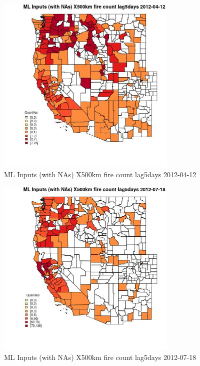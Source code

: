\begin{figure} 
\centering  
\includegraphics[width=0.77\textwidth]{Code_Outputs/Report_ML_input_PM25_Step4_part_e_de_duplicated_aves_compiled_2019-05-14wNAs_CountyX500km_fire_count_lag5daysMean2012-04-12_2012-04-12.jpg} 
\caption{\label{fig:Report_ML_input_PM25_Step4_part_e_de_duplicated_aves_compiled_2019-05-14wNAsCountyX500km_fire_count_lag5daysMean2012-04-12_2012-04-12}ML Inputs (with NAs) X500km fire count lag5days 2012-04-12} 
\end{figure} 
 

\begin{figure} 
\centering  
\includegraphics[width=0.77\textwidth]{Code_Outputs/Report_ML_input_PM25_Step4_part_e_de_duplicated_aves_compiled_2019-05-14wNAs_CountyX500km_fire_count_lag5daysMean2012-07-18_2012-07-18.jpg} 
\caption{\label{fig:Report_ML_input_PM25_Step4_part_e_de_duplicated_aves_compiled_2019-05-14wNAsCountyX500km_fire_count_lag5daysMean2012-07-18_2012-07-18}ML Inputs (with NAs) X500km fire count lag5days 2012-07-18} 
\end{figure} 
 

